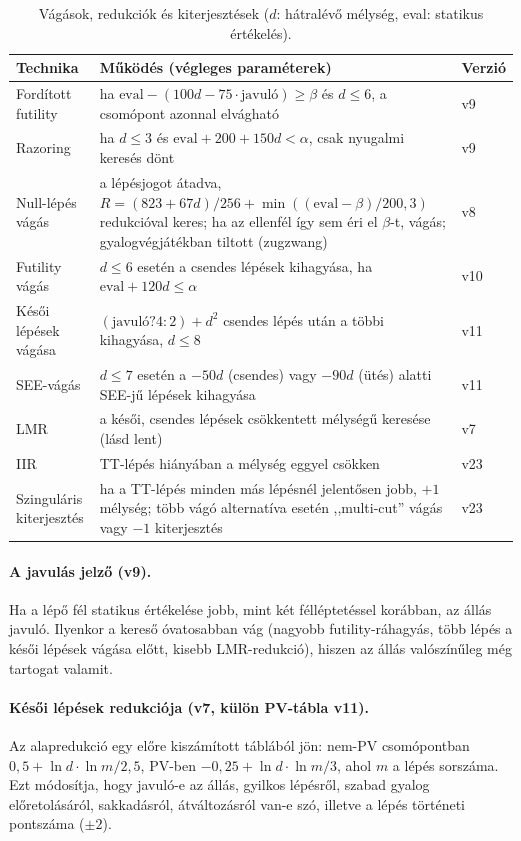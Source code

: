 \begin{table}[!ht]
	\scriptsize
	\centering
	\begin{tabularx}{\linewidth}{l X l}
		\toprule
		Technika & Működés (végleges paraméterek) & Verzió \\
		\midrule
		Fordított futility & ha $\text{eval} - (100d - 75\cdot\text{javuló}) \ge \beta$ és $d \le 6$, a csomópont azonnal elvágható & v9 \\
		Razoring & ha $d \le 3$ és $\text{eval} + 200 + 150d < \alpha$, csak nyugalmi keresés dönt & v9 \\
		Null-lépés vágás & a lépésjogot átadva, $R = (823 + 67d)/256 + \min((\text{eval}-\beta)/200, 3)$ redukcióval keres; ha az ellenfél így sem éri el $\beta$-t, vágás; gyalogvégjátékban tiltott (zugzwang) & v8 \\
		Futility vágás & $d \le 6$ esetén a csendes lépések kihagyása, ha $\text{eval} + 120d \le \alpha$ & v10 \\
		Késői lépések vágása & $(\text{javuló} ? 4 : 2) + d^2$ csendes lépés után a többi kihagyása, $d \le 8$ & v11 \\
		SEE-vágás & $d \le 7$ esetén a $-50d$ (csendes) vagy $-90d$ (ütés) alatti SEE-jű lépések kihagyása & v11 \\
		LMR & a késői, csendes lépések csökkentett mélységű keresése (lásd lent) & v7 \\
		IIR & TT-lépés hiányában a mélység eggyel csökken & v23 \\
		Szinguláris kiterjesztés & ha a TT-lépés minden más lépésnél jelentősen jobb, $+1$ mélység; több vágó alternatíva esetén ,,multi-cut'' vágás vagy $-1$ kiterjesztés & v23 \\
		\bottomrule
	\end{tabularx}
	\caption{Vágások, redukciók és kiterjesztések ($d$: hátralévő mélység, eval: statikus értékelés).}
	\label{tab:pruning}
\end{table}

\paragraph{A javulás jelző (v9).} Ha a lépő fél statikus értékelése jobb, mint két félléptetéssel korábban, az állás javuló. Ilyenkor a kereső óvatosabban vág (nagyobb futility-ráhagyás, több lépés a késői lépések vágása előtt, kisebb LMR-redukció), hiszen az állás valószínűleg még tartogat valamit.

\paragraph{Késői lépések redukciója (v7, külön PV-tábla v11).} Az alapredukció egy előre kiszámított táblából jön: nem-PV csomópontban $0{,}5 + \ln d \cdot \ln m / 2{,}5$, PV-ben $-0{,}25 + \ln d \cdot \ln m / 3$, ahol $m$ a lépés sorszáma. Ezt módosítja, hogy javuló-e az állás, gyilkos lépésről, szabad gyalog előretolásáról, sakkadásról, átváltozásról van-e szó, illetve a lépés történeti pontszáma ($\pm2$).

